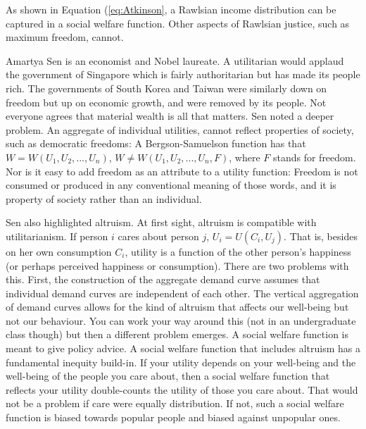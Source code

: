 As shown in Equation (\ref{eq:Atkinson}, a Rawlsian income distribution can be captured in a social welfare function. Other aspects of Rawlsian justice, such as maximum freedom, cannot.

Amartya Sen is an economist and Nobel laureate. A utilitarian would applaud the government of Singapore which is fairly authoritarian but has made its people rich. The governments of South Korea and Taiwan were similarly down on freedom but up on economic growth, and were removed by its people. Not everyone agrees that material wealth is all that matters. Sen noted a deeper problem. An aggregate of individual utilities, cannot reflect properties of society, such as democratic freedoms: A Bergson-Samuelson function has that $W=W(U_1, U_2, ..., U_n)$, $W \neq W(U_1, U_2, ..., U_n, F)$, where $F$ stands for freedom. Nor is it easy to add freedom as an attribute to a utility function: Freedom is not consumed or produced in any conventional meaning of those words, and it is property of society rather than an individual.

Sen also highlighted altruism. At first sight, altruism is compatible with utilitarianism. If person $i$ cares about person $j$, $U_i=U(C_i, U_j)$. That is, besides on her own consumption $C_i$, utility is a function of the other person's happiness (or perhaps perceived happiness or consumption). There are two problems with this. First, the construction of the aggregate demand curve assumes that individual demand curves are independent of each other. The vertical aggregation of demand curves allows for the kind of altruism that affects our well-being but not our behaviour. You can work your way around this (not in an undergraduate class though) but then a different problem emerges. A social welfare function is meant to give policy advice. A social welfare function that includes altruism has a fundamental inequity build-in. If your utility depends on your well-being and the well-being of the people you care about, then a social welfare function that reflects your utility double-counts the utility of those you care about. That would not be a problem if care were equally distribution. If not, such a social welfare function is biased towards popular people and biased against unpopular ones.

